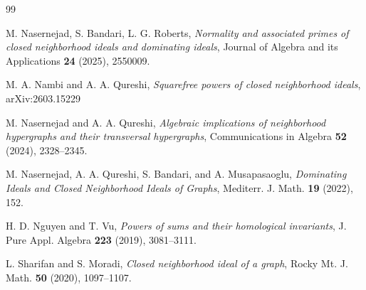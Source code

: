 \documentclass[12pt,reqno,twoside]{amsart}
\theoremstyle{definition}
\theoremstyle{plain}
\theoremstyle{remark}
\numberwithin{equation}{section}
\begin{document}
\begin{thebibliography}{99}
 

M. Nasernejad, S. Bandari, L. G. Roberts,
{\em Normality and associated primes of closed neighborhood ideals and dominating ideals}, Journal of Algebra and its Applications {\bf 24} (2025), 2550009.

 M. A. Nambi and A. A. Qureshi, \textit{Squarefree powers of closed neighborhood ideals}, arXiv:2603.15229



 M. Nasernejad and A. A. Qureshi, \emph{Algebraic implications of neighborhood hypergraphs and their transversal hypergraphs}, Communications in Algebra {\bf 52} (2024), 2328--2345.
 
M. Nasernejad, A. A. Qureshi, S. Bandari, and A. Musapasaoglu,
{\em Dominating Ideals and Closed Neighborhood Ideals of Graphs}, Mediterr. J. Math. {\bf 19} (2022), 152.


H. D. Nguyen and T. Vu,
{\em Powers of sums and their homological invariants}, J. Pure Appl. Algebra {\bf 223} (2019), 3081--3111.


L. Sharifan and S. Moradi,
\emph{Closed neighborhood ideal of a graph}, Rocky Mt. J. Math. {\bf 50} (2020), 1097--1107.


 


\end{thebibliography}
\end{document}
